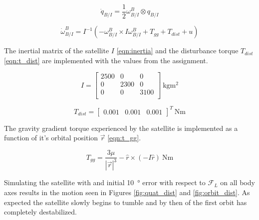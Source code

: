 \documentclass{article}
\begin{document}
\begin{equation}
	\dot{q}_{B/I} = \frac{1}{2} \omega_{B/I}^B \otimes q_{B/I}
	\label{eqn:kin_sat}
\end{equation}

\begin{equation}
	\dot{\omega}_{B/I}^{B} = I^{-1} \left(-\omega_{B/I}^B \times I\omega_{B/I}^B + T_{gg} + T_{dist} + u\right)
	\label{eqn:dyn_sat}
\end{equation}

The inertial matrix of the satellite $I$ \ref{eqn:inertia} and the disturbance torque $T_{dist}$ \ref{eqn:t_dist} are implemented with the values from the assignment.

\begin{equation}
	I = \left[\begin{matrix}
		2500 & 0    & 0 \\
		0    & 2300 & 0 \\
		0    & 0    & 3100 \\
	\end{matrix}\right] \SI{}{\kilogram\meter^2}
	\label{eqn:inertia}
\end{equation}

\begin{equation}
	T_{dist} = \left[\begin{matrix}
		0.001 & 0.001 & 0.001
	\end{matrix}\right]^T \SI{}{\newton\meter}
	\label{eqn:t_dist}
\end{equation}

The gravity gradient torque experienced by the satellite is implemented as a function of it's orbital position $\vec{r}$ \ref{eqn:t_gg}.

\begin{equation}
	T_{gg} = \frac{3\mu}{|\vec{r}|^3} -\hat{r} \times (-I\hat{r}) \SI{}{\newton\meter}
	\label{eqn:t_gg}
\end{equation}

Simulating the satellite with and initial \SI{10}{\degree} error with respect to $\mathcal{F}_L$ on all body axes results in the motion seen in Figures \ref{fig:quat_dist} and \ref{fig:orbit_dist}. As expected the satellite slowly begins to tumble and by then of the first orbit has completely destabilized.
\end{document}
